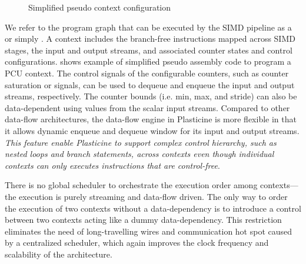 \begin{figure}
\inputminted{python}{code/context.py}
\caption[Example context configuration]{Simplified pseudo context configuration}
\label{fig:context}
\end{figure}

We refer to the program graph that can be executed by the SIMD pipeline as a  or
simply . 
A context includes the branch-free instructions mapped across SIMD stages, the input and output 
streams, and associated counter states and control configurations.
 shows example of simplified pseudo assembly code to program a PCU context.
The control signals of the configurable counters, such as counter saturation or 
signals, can be used to dequeue and enqueue the input and output streams, respectively.
The counter bounds (i.e. min, max, and stride) can also be data-dependent using values from the 
scalar input streams. Compared to other data-flow architectures, the data-flow engine in Plasticine 
is more flexible in that it allows dynamic enqueue and dequeue window for its input and output streams.
\emph{This feature enable Plasticine to support complex control hierarchy, such as nested loops and
branch statements, across contexts even though individual contexts can only executes instructions that are
control-free}. 

There is no global scheduler to orchestrate the execution order among contexts---the execution is purely
streaming and data-flow driven. 
The only way to order the execution of two contexts without a data-dependency is to 
introduce a control  between two contexts acting like a dummy data-dependency.
This restriction eliminates the need of long-travelling wires and communication hot spot caused by a
centralized scheduler, which  again improves the clock frequency and scalability of the architecture.

